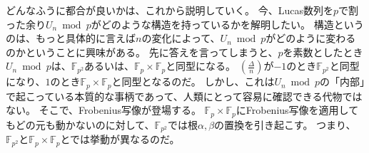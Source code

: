 
どんなふうに都合が良いかは、これから説明していく。
今、Lucas数列を$p$で割った余り$U_n \bmod{p}$がどのような構造を持っているかを解明したい。
構造というのは、もっと具体的に言えば$n$の変化によって、$U_n \bmod{p}$がどのように変わるのかということに興味がある。
先に答えを言ってしまうと、$p$を素数としたとき$U_n \bmod{p}$は、$\mathbb{F}_{p^2}$あるいは、$\mathbb{F}_p\times\mathbb{F}_p$と同型になる。
$\left(\frac{\Delta}{n}\right)$が$-1$のとき$\mathbb{F}_{p^2}$と同型になり、$1$のとき$\mathbb{F}_p\times\mathbb{F}_p$と同型となるのだ。
しかし、これは$U_n \bmod{p}$の「内部」で起こっている本質的な事柄であって、人類にとって容易に確認できる代物ではない。
そこで、Frobenius写像が登場する。
$\mathbb{F}_p\times\mathbb{F}_p$にFrobenius写像を適用してもどの元も動かないのに対して、$\mathbb{F}_{p^2}$では根$\alpha,\beta$の置換を引き起こす。
つまり、$\mathbb{F}_{p^2}$と$\mathbb{F}_p\times\mathbb{F}_p$とでは挙動が異なるのだ。

